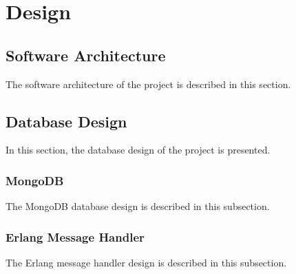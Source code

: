 \chapter{Design}

\section{Software Architecture}

The software architecture of the project is described in this section.

\section{Database Design}

In this section, the database design of the project is presented.

\subsection{MongoDB}

The MongoDB database design is described in this subsection.

\subsection{Erlang Message Handler}

The Erlang message handler design is described in this subsection.